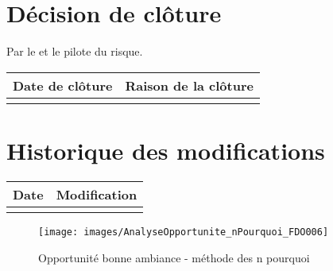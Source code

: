 \section*{Décision de clôture}
Par le \CP{} et le pilote du risque.
\begin{table}[h]
\centering
	\begin{tabularx}{16.8cm}{|X|X|}
	\hline
	\rowcolor{gray!40} Date de clôture & Raison de la clôture \\
	\hline
	  & \\
	\hline
	\end{tabularx}
\end{table}

\section*{Historique des modifications}
\begin{table}[h]
\centering
	\begin{tabularx}{16.8cm}{|X|X|}
	\hline
	\rowcolor{gray!40} Date & Modification \\%
	\hline
	  & \\
	\hline
	\end{tabularx}
\end{table}
\newpage


\begin{figure}
	\centering
	\texttt{[image: images/AnalyseOpportunite\_nPourquoi\_FDO006]}
	\caption{\label{opportunite bonne ambiance}Opportunité bonne ambiance - méthode des n pourquoi}
\end{figure}
